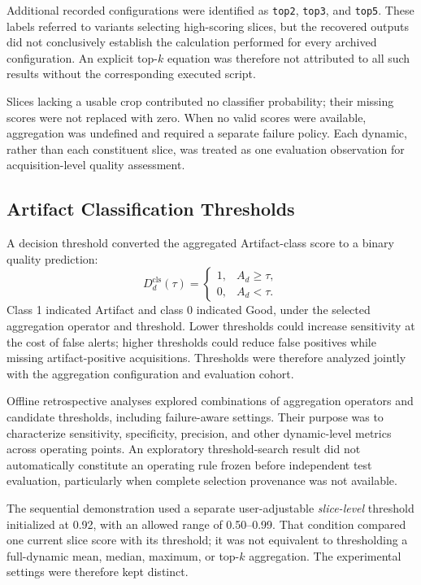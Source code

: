 Additional recorded configurations were identified as \texttt{top2}, \texttt{top3}, and \texttt{top5}. These labels referred to variants selecting high-scoring slices, but the recovered outputs did not conclusively establish the calculation performed for every archived configuration. An explicit top-$k$ equation was therefore not attributed to all such results without the corresponding executed script.

Slices lacking a usable crop contributed no classifier probability; their missing scores were not replaced with zero. When no valid scores were available, aggregation was undefined and required a separate failure policy. Each dynamic, rather than each constituent slice, was treated as one evaluation observation for acquisition-level quality assessment.

\subsection{Artifact Classification Thresholds}
\label{subsec:2d_dynamic_thresholds}

A decision threshold converted the aggregated Artifact-class score to a binary quality prediction:
\begin{equation}
D_d^{\mathrm{cls}}(\tau)=
\begin{cases}
1,& A_d\geq\tau,\\
0,& A_d<\tau.
\end{cases}
\end{equation}
Class 1 indicated Artifact and class 0 indicated Good, under the selected aggregation operator and threshold. Lower thresholds could increase sensitivity at the cost of false alerts; higher thresholds could reduce false positives while missing artifact-positive acquisitions. Thresholds were therefore analyzed jointly with the aggregation configuration and evaluation cohort.

Offline retrospective analyses explored combinations of aggregation operators and candidate thresholds, including failure-aware settings. Their purpose was to characterize sensitivity, specificity, precision, and other dynamic-level metrics across operating points. An exploratory threshold-search result did not automatically constitute an operating rule frozen before independent test evaluation, particularly when complete selection provenance was not available.

The sequential demonstration used a separate user-adjustable \emph{slice-level} threshold initialized at 0.92, with an allowed range of 0.50--0.99. That condition compared one current slice score with its threshold; it was not equivalent to thresholding a full-dynamic mean, median, maximum, or top-$k$ aggregation. The experimental settings were therefore kept distinct.

